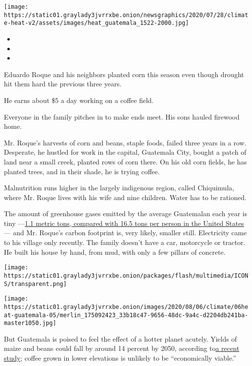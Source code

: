 \texttt{[image: https://static01.graylady3jvrrxbe.onion/newsgraphics/2020/07/28/climate-heat-v2/assets/images/heat\_guatemala\_1522-2000.jpg]}

\begin{itemize}
\item
\item
\item
\end{itemize}

Eduardo Roque and his neighbors planted corn this season even though
drought hit them hard the previous three years.

He earns about \$5 a day working on a coffee field.

 Everyone in the family pitches in to make ends meet. His sons hauled
firewood home.

Mr. Roque's harvests of corn and beans, staple foods, failed three years
in a row. Desperate, he hustled for work in the capital, Guatemala City,
bought a patch of land near a small creek, planted rows of corn there.
On his old corn fields, he has planted trees, and in their shade, he is
trying coffee.

Malnutrition runs higher in the largely indigenous region, called
Chiquimula, where Mr. Roque lives with his wife and nine children. Water
has to be rationed.

The amount of greenhouse gases emitted by the average Guatemalan each
year is tiny
---\href{https://data.worldbank.org/indicator/EN.ATM.CO2E.PC?locations=GT}{}\href{https://data.worldbank.org/indicator/EN.ATM.CO2E.PC?locations=GT}{1.1
metric tons, compared with 16.5 tons per person in the United States}
--- and Mr. Roque's carbon footprint is, very likely, smaller still.
Electricity came to his village only recently. The family doesn't have a
car, motorcycle or tractor. He built his house by hand, from mud, with
only a few pillars of concrete.

\texttt{[image: https://static01.graylady3jvrrxbe.onion/packages/flash/multimedia/ICONS/transparent.png]}

\texttt{[image: https://static01.graylady3jvrrxbe.onion/images/2020/08/06/climate/06heat-guatemala-05/merlin\_175092423\_33b18c47-9656-48dc-9a4c-d2204db241ba-master1050.jpg]}

But Guatemala is poised to feel the effect of a hotter planet acutely.
Yields of maize and beans could fall by around 14 percent by 2050,
according
to\href{https://www.ifpri.org/publication/climate-change-agriculture-and-adaptation-options-guatemala}{}\href{https://www.ifpri.org/publication/climate-change-agriculture-and-adaptation-options-guatemala}{a
recent study}; coffee grown in lower elevations is unlikely to be
``economically viable.''

